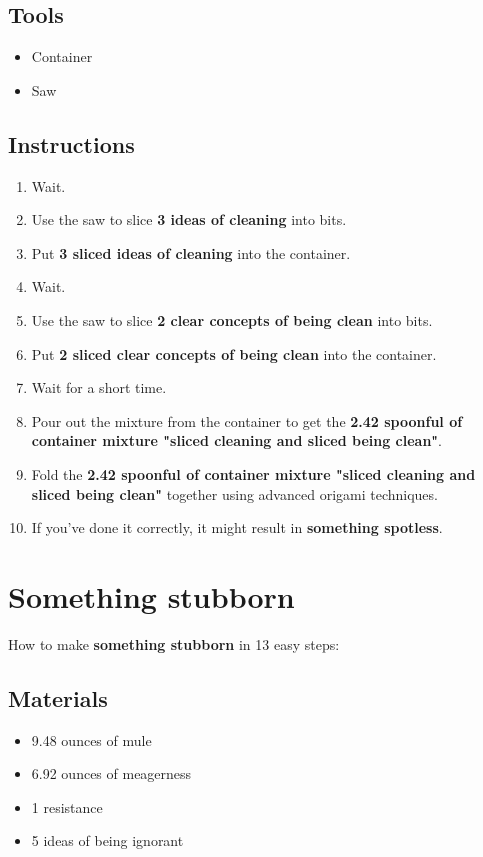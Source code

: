 \documentclass{article}
\begin{document}
\subsection{Tools}\begin{itemize}
\item 
Container
\item 
Saw
\end{itemize}
\subsection{Instructions}\begin{enumerate}
\item 
Wait.
\item 
Use the saw to slice \textbf{3 ideas of cleaning} into bits.
\item 
Put \textbf{3 sliced ideas of cleaning} into the container.
\item 
Wait.
\item 
Use the saw to slice \textbf{2 clear concepts of being clean} into bits.
\item 
Put \textbf{2 sliced clear concepts of being clean} into the container.
\item 
Wait for a short time.
\item 
Pour out the mixture from the container to get the \textbf{2.42 spoonful of container mixture "sliced cleaning and sliced being clean"}.
\item 
Fold the \textbf{2.42 spoonful of container mixture "sliced cleaning and sliced being clean"} together using advanced origami techniques.
\item 
If you've done it correctly, it might result in \textbf{something spotless}.
\end{enumerate}
\newpage
\section{Something stubborn}How to make \textbf{something stubborn} in 13 easy steps:

\subsection{Materials}\begin{itemize}
\item 
9.48 ounces of mule
\item 
6.92 ounces of meagerness
\item 
1 resistance
\item 
5 ideas of being ignorant
\end{itemize}
\end{document}
